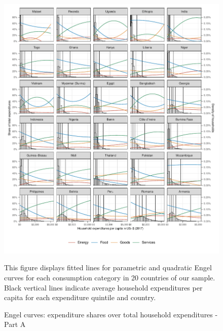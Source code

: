 \documentclass[12pt, a4paper]{article}
\newenvironment{subcaption}
{\strut
\vspace{-5pt}
\begin{minipage}[b]{0.9\textwidth}
  \hspace*{-\parindent}
  \footnotesize}
 {\end{minipage}}
\begin{document}
\begin{figure}[ht!]
  \centering
  \caption{Engel curves: expenditure shares over total household expenditures - Part A} \label{fig:A1}
  \includegraphics{Analysis_Parametric_Engel_Curves/Parametric_EC_0_A}
  \begin{subcaption}
    This figure displays fitted lines for parametric and quadratic Engel curves for each consumption category in 20 countries of our sample. Black vertical lines indicate average household expenditures per capita for each expenditure quintile and country.
  \end{subcaption}

\end{figure}

\clearpage
\end{document}
